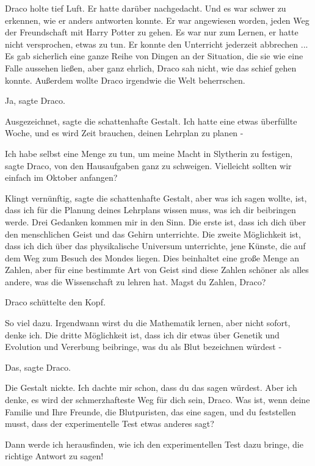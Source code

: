 Draco holte tief Luft. Er hatte darüber nachgedacht. Und es war schwer zu
erkennen, wie er anders antworten konnte. Er war angewiesen worden, jeden Weg
der Freundschaft mit Harry Potter zu gehen. Es war nur zum Lernen, er hatte
nicht versprochen, etwas zu tun. Er konnte den Unterricht jederzeit abbrechen ...
Es gab sicherlich eine ganze Reihe von Dingen an der Situation, die sie wie eine
Falle aussehen ließen, aber ganz ehrlich, Draco sah nicht, wie das schief gehen
konnte. Außerdem wollte Draco irgendwie die Welt beherrschen.

\glqq{}Ja\grqq{}, sagte Draco.

\glqq{}Ausgezeichnet\grqq{}, sagte die schattenhafte Gestalt. \glqq{}Ich hatte
eine etwas überfüllte Woche, und es wird Zeit brauchen, deinen Lehrplan zu
planen -\grqq{}

\glqq{}Ich habe selbst eine Menge zu tun, um meine Macht in Slytherin zu
festigen\grqq{}, sagte Draco, \glqq{}von den Hausaufgaben ganz zu schweigen.
Vielleicht sollten wir einfach im Oktober anfangen?\grqq{}

\glqq{}Klingt vernünftig\grqq{}, sagte die schattenhafte Gestalt, \glqq{}aber was
ich sagen wollte, ist, dass ich für die Planung deines Lehrplans wissen muss,
was ich dir beibringen werde. Drei Gedanken kommen mir in den Sinn. Die erste
ist, dass ich dich über den menschlichen Geist und das Gehirn unterrichte. Die
zweite Möglichkeit ist, dass ich dich über das physikalische Universum
unterrichte, jene Künste, die auf dem Weg zum Besuch des Mondes liegen. Dies
beinhaltet eine große Menge an Zahlen, aber für eine bestimmte Art von Geist
sind diese Zahlen schöner als alles andere, was die Wissenschaft zu lehren hat.
Magst du Zahlen, Draco?\grqq{}

Draco schüttelte den Kopf.

\glqq{}So viel dazu. Irgendwann wirst du die Mathematik lernen, aber nicht
sofort, denke ich. Die dritte Möglichkeit ist, dass ich dir etwas über Genetik
und Evolution und Vererbung beibringe, was du als Blut bezeichnen würdest
-\grqq{}

\glqq{}Das\grqq{}, sagte Draco.

Die Gestalt nickte. \glqq{}Ich dachte mir schon, dass du das sagen würdest. Aber
ich denke, es wird der schmerzhafteste Weg für dich sein, Draco. Was ist, wenn
deine Familie und Ihre Freunde, die Blutpuristen, das eine sagen, und du
feststellen musst, dass der experimentelle Test etwas anderes sagt?\grqq{}

\glqq{}Dann werde ich herausfinden, wie ich den experimentellen Test dazu bringe,
die richtige Antwort zu sagen!\grqq{}


